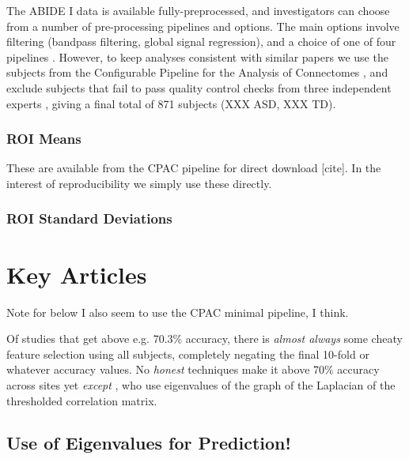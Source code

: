 \documentclass[10pt]{article}
\begin{document}
The ABIDE I data is available fully-preprocessed, and investigators can choose from a number of
pre-processing pipelines and options. The main options involve filtering (bandpass filtering, global
signal regression), and a choice of one of four pipelines \citep{dimartinoAutismBrainImaging2014}.
However, to keep analyses consistent with similar papers
\citet{abrahamDerivingReproducibleBiomarkers2017, mostafaDiagnosisAutismSpectrum2019,
yinDiagnosisAutismSpectrum2021, heinsfeldIdentificationAutismSpectrum2018} we use the subjects from
the Configurable Pipeline for the Analysis of Connectomes
\citep{cameronAutomatedAnalysisConnectomes2013}, and exclude subjects that fail to pass quality
control checks from three independent experts \citep[see][for
details]{abrahamDerivingReproducibleBiomarkers2017}, giving a final total of 871 subjects (XXX ASD,
XXX TD).



\subsubsection{ROI Means}

These are available from the CPAC pipeline for direct download [cite]. In the interest of reproducibility we simply
use these directly.

\subsubsection{ROI Standard Deviations}






\newpage

\section{Key Articles} \label{key-articles}

Note for below I also seem to use the CPAC minimal pipeline, I think.

Of studies that get above e.g. 70.3\% accuracy, there is \emph{almost always} some cheaty feature
selection using all subjects, completely negating the final 10-fold or whatever accuracy values. No
\emph{honest} techniques make it above 70\% accuracy across sites yet \emph{except}
\citet{mostafaDiagnosisAutismSpectrum2019,yinDiagnosisAutismSpectrum2021}, who use eigenvalues of
the graph of the Laplacian of the thresholded correlation matrix.

\subsection{Use of Eigenvalues for Prediction! \citet{mostafaDiagnosisAutismSpectrum2019}} \label{eig-pred}
\end{document}
